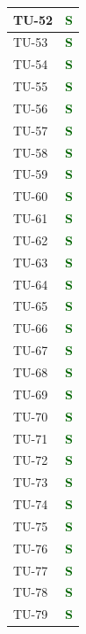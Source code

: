 \begin{longtable}{|C{2.5cm}|C{2.5cm}|}
	\hline
	{TU-52} & \textcolor{darkgreen}{\textbf{S}}\\
	\hline
	{TU-53} & \textcolor{darkgreen}{\textbf{S}}\\
	\hline
	{TU-54} & \textcolor{darkgreen}{\textbf{S}}\\
	\hline
	{TU-55} & \textcolor{darkgreen}{\textbf{S}}\\
	\hline
	{TU-56} & \textcolor{darkgreen}{\textbf{S}}\\
	\hline
	{TU-57} & \textcolor{darkgreen}{\textbf{S}}\\
	\hline
	{TU-58} & \textcolor{darkgreen}{\textbf{S}}\\
	\hline
	{TU-59} & \textcolor{darkgreen}{\textbf{S}}\\
	\hline
	{TU-60} & \textcolor{darkgreen}{\textbf{S}}\\
	\hline
	{TU-61} & \textcolor{darkgreen}{\textbf{S}}\\
	\hline
	{TU-62} & \textcolor{darkgreen}{\textbf{S}}\\
	\hline
	{TU-63} & \textcolor{darkgreen}{\textbf{S}}\\
	\hline
	{TU-64} & \textcolor{darkgreen}{\textbf{S}}\\
	\hline
	{TU-65} & \textcolor{darkgreen}{\textbf{S}}\\
	\hline
	{TU-66} & \textcolor{darkgreen}{\textbf{S}}\\
	\hline
	{TU-67} & \textcolor{darkgreen}{\textbf{S}}\\
	\hline
	{TU-68} & \textcolor{darkgreen}{\textbf{S}}\\
	\hline
	{TU-69} & \textcolor{darkgreen}{\textbf{S}}\\
	\hline
	{TU-70} & \textcolor{darkgreen}{\textbf{S}}\\
	\hline
	{TU-71} & \textcolor{darkgreen}{\textbf{S}}\\
	\hline
	{TU-72} & \textcolor{darkgreen}{\textbf{S}}\\
	\hline
	{TU-73} & \textcolor{darkgreen}{\textbf{S}}\\
	\hline
	{TU-74} & \textcolor{darkgreen}{\textbf{S}}\\
	\hline
	{TU-75} & \textcolor{darkgreen}{\textbf{S}}\\
	\hline
	{TU-76} & \textcolor{darkgreen}{\textbf{S}}\\
	\hline
	{TU-77} & \textcolor{darkgreen}{\textbf{S}}\\
	\hline
	{TU-78} & \textcolor{darkgreen}{\textbf{S}}\\
	\hline
	{TU-79} & \textcolor{darkgreen}{\textbf{S}}\\

\end{longtable}
